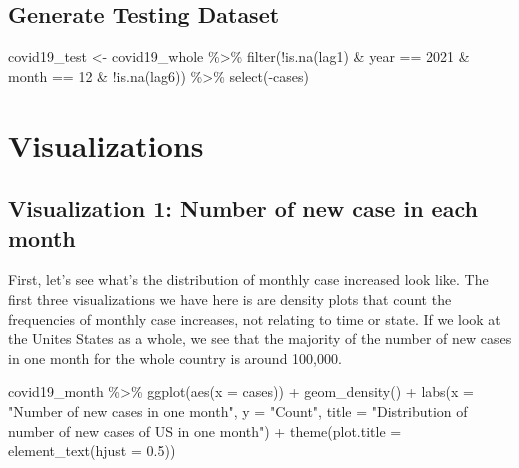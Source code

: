 \documentclass[
]{book}
\newenvironment{Shaded}{\begin{snugshade}}{\end{snugshade}}
\newcommand{\AttributeTok}[1]{\textcolor[rgb]{0.77,0.63,0.00}{#1}}
\newcommand{\DecValTok}[1]{\textcolor[rgb]{0.00,0.00,0.81}{#1}}
\newcommand{\FloatTok}[1]{\textcolor[rgb]{0.00,0.00,0.81}{#1}}
\newcommand{\FunctionTok}[1]{\textcolor[rgb]{0.00,0.00,0.00}{#1}}
\newcommand{\NormalTok}[1]{#1}
\newcommand{\OtherTok}[1]{\textcolor[rgb]{0.56,0.35,0.01}{#1}}
\newcommand{\SpecialCharTok}[1]{\textcolor[rgb]{0.00,0.00,0.00}{#1}}
\newcommand{\StringTok}[1]{\textcolor[rgb]{0.31,0.60,0.02}{#1}}
\begin{document}
\hypertarget{generate-testing-dataset}{%
\section{Generate Testing Dataset}\label{generate-testing-dataset}}

\begin{Shaded}
\begin{Highlighting}[]
\NormalTok{covid19\_test }\OtherTok{\textless{}{-}}\NormalTok{ covid19\_whole }\SpecialCharTok{\%\textgreater{}\%}
  \FunctionTok{filter}\NormalTok{(}\SpecialCharTok{!}\FunctionTok{is.na}\NormalTok{(lag1) }\SpecialCharTok{\&}\NormalTok{ year }\SpecialCharTok{==} \DecValTok{2021} \SpecialCharTok{\&}\NormalTok{ month }\SpecialCharTok{==} \DecValTok{12} \SpecialCharTok{\&} \SpecialCharTok{!}\FunctionTok{is.na}\NormalTok{(lag6)) }\SpecialCharTok{\%\textgreater{}\%}
  \FunctionTok{select}\NormalTok{(}\SpecialCharTok{{-}}\NormalTok{cases)}
\end{Highlighting}
\end{Shaded}

\hypertarget{visualizations}{%
\chapter{Visualizations}\label{visualizations}}

\hypertarget{visualization-1-number-of-new-case-in-each-month}{%
\section{Visualization 1: Number of new case in each month}\label{visualization-1-number-of-new-case-in-each-month}}

First, let's see what's the distribution of monthly case increased look like. The first three visualizations we have here is are density plots that count the frequencies of monthly case increases, not relating to time or state. If we look at the Unites States as a whole, we see that the majority of the number of new cases in one month for the whole country is around 100,000.

\begin{Shaded}
\begin{Highlighting}[]
\NormalTok{covid19\_month }\SpecialCharTok{\%\textgreater{}\%}
  \FunctionTok{ggplot}\NormalTok{(}\FunctionTok{aes}\NormalTok{(}\AttributeTok{x =}\NormalTok{ cases)) }\SpecialCharTok{+}
  \FunctionTok{geom\_density}\NormalTok{() }\SpecialCharTok{+}
  \FunctionTok{labs}\NormalTok{(}\AttributeTok{x =} \StringTok{"Number of new cases in one month"}\NormalTok{, }\AttributeTok{y =} \StringTok{"Count"}\NormalTok{, }\AttributeTok{title =} \StringTok{"Distribution of number of new cases of US in one month"}\NormalTok{) }\SpecialCharTok{+}
  \FunctionTok{theme}\NormalTok{(}\AttributeTok{plot.title =} \FunctionTok{element\_text}\NormalTok{(}\AttributeTok{hjust =} \FloatTok{0.5}\NormalTok{))}
\end{Highlighting}
\end{Shaded}
\end{document}
